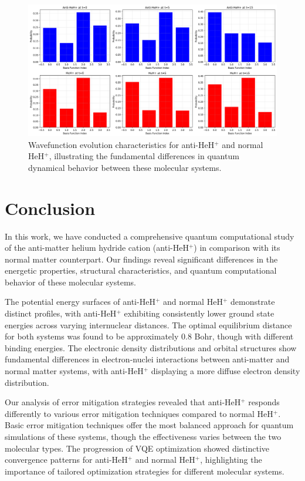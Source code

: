 \documentclass[10pt,twocolumn,a4paper]{article}
\begin{document}
\begin{figure}[t!]
    \centering
    \includegraphics[width=\columnwidth]{graphs/corrected_wavefunction_evolution.png}
    \caption{Wavefunction evolution characteristics for anti-HeH$^+$ and normal HeH$^+$, illustrating the fundamental differences in quantum dynamical behavior between these molecular systems.}
    \label{fig:wavefunction_evolution}
\end{figure}

\section{Conclusion}
In this work, we have conducted a comprehensive quantum computational study of the anti-matter helium hydride cation (anti-HeH$^+$) in comparison with its normal matter counterpart. Our findings reveal significant differences in the energetic properties, structural characteristics, and quantum computational behavior of these molecular systems.

The potential energy surfaces of anti-HeH$^+$ and normal HeH$^+$ demonstrate distinct profiles, with anti-HeH$^+$ exhibiting consistently lower ground state energies across varying internuclear distances. The optimal equilibrium distance for both systems was found to be approximately 0.8 Bohr, though with different binding energies. The electronic density distributions and orbital structures show fundamental differences in electron-nuclei interactions between anti-matter and normal matter systems, with anti-HeH$^+$ displaying a more diffuse electron density distribution.

Our analysis of error mitigation strategies revealed that anti-HeH$^+$ responds differently to various error mitigation techniques compared to normal HeH$^+$. Basic error mitigation techniques offer the most balanced approach for quantum simulations of these systems, though the effectiveness varies between the two molecular types. The progression of VQE optimization showed distinctive convergence patterns for anti-HeH$^+$ and normal HeH$^+$, highlighting the importance of tailored optimization strategies for different molecular systems.
\end{document}
